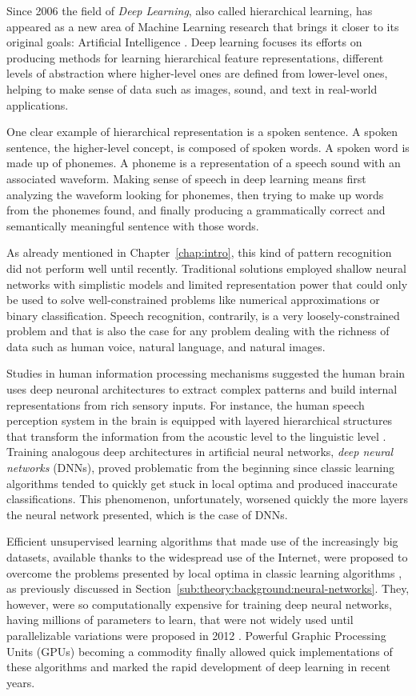Since 2006 the field of \emph{Deep Learning}, also called hierarchical learning, has appeared as a new area of Machine Learning research that brings it closer to its original goals: Artificial Intelligence \cite{Deng2014}.
Deep learning focuses its efforts on producing methods for learning hierarchical feature representations, different levels of abstraction where higher-level ones are defined from lower-level ones, helping to make sense of data such as images, sound, and text in real-world applications.

One clear example of hierarchical representation is a spoken sentence.
A spoken sentence, the higher-level concept, is composed of spoken words.
A spoken word is made up of phonemes.
A phoneme is a representation of a speech sound with an associated waveform.
Making sense of speech in deep learning means first analyzing the waveform looking for phonemes, then trying to make up words from the phonemes found, and finally producing a grammatically correct and semantically meaningful sentence with those words.

As already mentioned in Chapter~\ref{chap:intro}, this kind of pattern recognition did not perform well until recently.
Traditional solutions employed shallow neural networks with simplistic models and limited representation power that could only be used to solve well-constrained problems like numerical approximations or binary classification.
Speech recognition, contrarily, is a very loosely-constrained problem and that is also the case for any problem dealing with the richness of data such as human voice, natural language, and natural images.

Studies in human information processing mechanisms suggested the human brain uses deep neuronal architectures to extract complex patterns and build internal representations from rich sensory inputs.
For instance, the human speech perception system in the brain is equipped with layered hierarchical structures that transform the information from the acoustic level to the linguistic level \cite{Deng1999,Baker2009}.
Training analogous deep architectures in artificial neural networks, \emph{deep neural networks} (DNNs), proved problematic from the beginning since classic learning algorithms tended to quickly get stuck in local optima and produced inaccurate classifications.
This phenomenon, unfortunately, worsened quickly the more layers the neural network presented, which is the case of DNNs.

Efficient unsupervised learning algorithms that made use of the increasingly big datasets, available thanks to the widespread use of the Internet, were proposed to overcome the problems presented by local optima in classic learning algorithms \cite{LeCun2004,Hinton2006}, as previously discussed in Section~\ref{sub:theory:background:neural-networks}.
They, however, were so computationally expensive for training deep neural networks, having millions of parameters to learn, that were not widely used until parallelizable variations were proposed in 2012 \cite{Dean2012,Chen2012}.
Powerful Graphic Processing Units (GPUs) becoming a commodity finally allowed quick implementations of these algorithms and marked the rapid development of deep learning in recent years.

